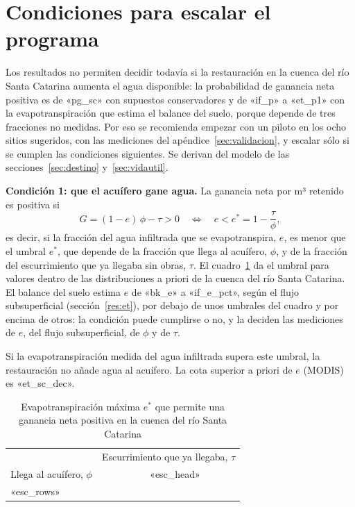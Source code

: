 \section{Condiciones para escalar el programa}\label{sec:escalar}

Los resultados no permiten decidir todavía si la restauración en la cuenca del río Santa Catarina aumenta el agua disponible: la probabilidad de ganancia neta positiva es de «pg_sc» con supuestos conservadores y de «if_p» a «et_p1» con la evapotranspiración que estima el balance del suelo, porque depende de tres fracciones no medidas. Por eso se recomienda empezar con un piloto en los ocho sitios sugeridos, con las mediciones del apéndice~\ref{sec:validacion}, y escalar sólo si se cumplen las condiciones siguientes. Se derivan del modelo de las secciones~\ref{sec:destino} y~\ref{sec:vidautil}.

\textbf{Condición 1: que el acuífero gane agua.} La ganancia neta por m³ retenido es positiva si
\begin{equation}
G=(1-e)\,\phi-\tau>0 \quad\Longleftrightarrow\quad e<e^\ast=1-\frac{\tau}{\phi},
\end{equation}
es decir, si la fracción del agua infiltrada que se evapotranspira, $e$, es menor que el umbral $e^\ast$, que depende de la fracción que llega al acuífero, $\phi$, y de la fracción del escurrimiento que ya llegaba sin obras, $\tau$. El cuadro~\ref{tab:escalar} da el umbral para valores dentro de las distribuciones a priori de la cuenca del río Santa Catarina. El balance del suelo estima $e$ de «bk_e» a «if_e_pct», según el flujo subsuperficial (sección~\ref{res:et}), por debajo de unos umbrales del cuadro y por encima de otros: la condición puede cumplirse o no, y la deciden las mediciones de $e$, del flujo subsuperficial, de $\phi$ y de $\tau$.

\begin{table}[H]\centering\small
\caption{Evapotranspiración máxima $e^\ast$ que permite una ganancia neta positiva en la cuenca del río Santa Catarina}\label{tab:escalar}
{\color{gris}Si la evapotranspiración medida del agua infiltrada supera este umbral, la restauración no añade agua al acuífero. La cota superior a priori de $e$ (MODIS) es «et_sc_dec».\par}\smallskip
\begin{tabular}{lrrr}
\toprule
 & \multicolumn{3}{c}{Escurrimiento que ya llegaba, $\tau$} \\
Llega al acuífero, $\phi$ & «esc_head» \\
\midrule
«esc_rows»
\bottomrule
\end{tabular}
\end{table}

